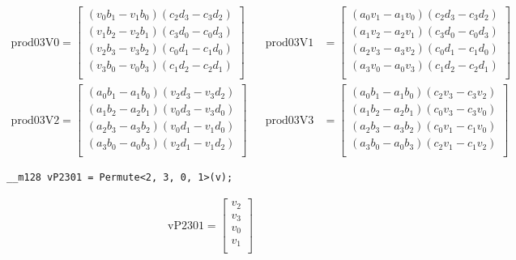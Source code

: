 \documentclass[fontsize = 10pt,DIV = 13]{scrartcl}
\newcommand{\pth}[1]{\left(#1\right)}
\begin{document}
\begin{align*}
\mathrm{prod03V0} 
=
\begin{bmatrix}
\pth{v_0b_1 - v_1b_0}\pth{c_2d_3 - c_3d_2}\\
\pth{v_1b_2 - v_2b_1}\pth{c_3d_0 - c_0d_3}\\
\pth{v_2b_3 - v_3b_2}\pth{c_0d_1 - c_1d_0}\\
\pth{v_3b_0 - v_0b_3}\pth{c_1d_2 - c_2d_1}\\
\end{bmatrix}
&&
\mathrm{prod03V1} 
&=
\begin{bmatrix}
\pth{a_0v_1 - a_1v_0}\pth{c_2d_3 - c_3d_2}\\
\pth{a_1v_2 - a_2v_1}\pth{c_3d_0 - c_0d_3}\\
\pth{a_2v_3 - a_3v_2}\pth{c_0d_1 - c_1d_0}\\
\pth{a_3v_0 - a_0v_3}\pth{c_1d_2 - c_2d_1}\\
\end{bmatrix}
\\
\mathrm{prod03V2} 
=
\begin{bmatrix}
\pth{a_0b_1 - a_1b_0}\pth{v_2d_3 - v_3d_2}\\
\pth{a_1b_2 - a_2b_1}\pth{v_0d_3 - v_3d_0}\\
\pth{a_2b_3 - a_3b_2}\pth{v_0d_1 - v_1d_0}\\
\pth{a_3b_0 - a_0b_3}\pth{v_2d_1 - v_1d_2}\\
\end{bmatrix}
&&
\mathrm{prod03V3} 
&=
\begin{bmatrix}
\pth{a_0b_1 - a_1b_0}\pth{c_2v_3 - c_3v_2}\\
\pth{a_1b_2 - a_2b_1}\pth{c_0v_3 - c_3v_0}\\
\pth{a_2b_3 - a_3b_2}\pth{c_0v_1 - c_1v_0}\\
\pth{a_3b_0 - a_0b_3}\pth{c_2v_1 - c_1v_2}\\
\end{bmatrix}
\end{align*}


\begin{verbatim}
__m128 vP2301 = Permute<2, 3, 0, 1>(v);
\end{verbatim}

\begin{align*}
\mathrm{vP2301} 
=
\begin{bmatrix}
v_2\\
v_3\\
v_0\\
v_1\\
\end{bmatrix}
\end{align*}
\end{document}
